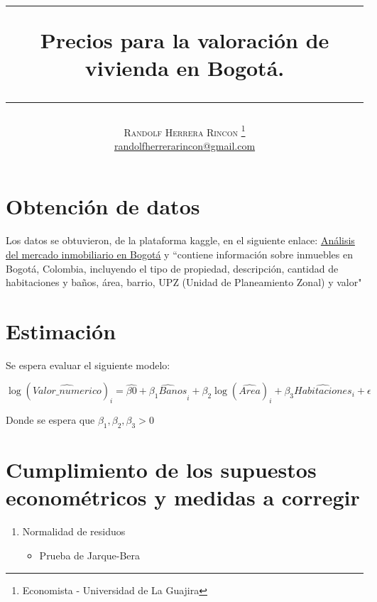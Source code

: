 \documentclass[12pt,a4paper]{article}
\title{   \begin{center}\rule{0.9\textwidth}{0.1mm} \end{center}
    {\Huge\textbf{Precios para la valoración de vivienda en Bogotá.}}
    \begin{center}\rule{0.9\textwidth}{0.1mm} \end{center}
}
\author{\textsc{Randolf Herrera Rincon}
    \thanks{Economista - Universidad de La Guajira}\\
    \normalsize 
    \href{mailto:randolfherrerarincon@gmail.com}{randolfherrerarincon@gmail.com}   
}
\begin{document}
\maketitle
\tableofcontents
\newpage

\section{Obtención de datos}
Los datos se obtuvieron, de la plataforma kaggle, en el siguiente enlace: \href{https://www.kaggle.com/datasets/pablobravo73/real-estate-bogota}{Análisis del mercado inmobiliario en Bogotá} y ``contiene información sobre inmuebles en Bogotá, Colombia, incluyendo el tipo de propiedad, descripción, cantidad de habitaciones y baños, área, barrio, UPZ (Unidad de Planeamiento Zonal) y valor" \citep{Camacho2024}
\section{Estimación}
Se espera evaluar el siguiente modelo:

\begin{equation}
	\log(\widehat{Valor\_numerico})_{i}=\widehat{\beta{0}} + \widehat{\beta_{1}Banos}_{i} + \beta_{2}\log(\widehat{Area})_{i} + \beta_{3}\widehat{Habitaciones}_{i} + \epsilon
\end{equation}

Donde se espera que $\beta_{1}, \beta_{2}, \beta_{3} > 0$

\section{Cumplimiento de los supuestos econométricos y medidas a corregir}

\begin{enumerate}
	\item Normalidad de residuos
	\begin{itemize}
		\item Prueba de Jarque-Bera
	\end{itemize}
\end{enumerate}

\newpage

     
\end{document}
